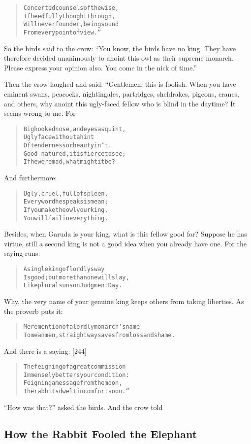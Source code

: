\documentclass[article, twoside, 14pt]{memoir}
\renewenvironment{verbatim}{%
\begin{quote}%
\vskip -10pt%
\begin{alltt}\normalfont\large}{\end{alltt}%
\end{quote}%
\vskip -10pt
} %
\begin{document}
\begin{verbatim}
Concerted counsels of the wise,
    If heedfully thought through,
Will never founder, being sound
    From every point of view.”
\end{verbatim}
So the birds said to the crow:
``You know, the birds have no king. They have therefore decided unanimously to anoint this owl as their supreme monarch. Please express your opinion also. You come in the nick of time.''

Then the crow laughed and said: “Gentlemen, this is foolish. When
you have eminent swans, peacocks, nightingales, partridges,
sheldrakes, pigeons, cranes, and others, why anoint this ugly-faced
fellow who is blind in the daytime? It seems wrong to me. For

\begin{verbatim}
Big hooked nose, and eyes asquint,
Ugly face without a hint
Of tenderness or beauty in 't.
Good-natured, it is fierce to see;
If he were mad, what might it be?
\end{verbatim}
And furthermore:

\begin{verbatim}
Ugly, cruel, full of spleen,
Every word he speaks is mean;
If you make the owl your king,
You will fail in everything.
\end{verbatim}
Besides, when Garuda is your king, what is this fellow good for?
Suppose he has virtue, still a second king is not a good idea when
you already have one. For the saying runs:

\begin{verbatim}
A single king of lordly sway
Is good; but more than one will slay,
Like plural suns on Judgment Day.
\end{verbatim}
Why, the very name of your genuine king keeps others from taking
liberties. As the proverb puts it:

\begin{verbatim}
Mere mention of a lordly monarch's name
To mean men, straightway saves from loss and shame.
\end{verbatim}
And there is a saying: [244]

\begin{verbatim}
The feigning of a great commission
Immensely betters your condition:
Feigning a message from the moon,
The rabbits dwelt in comfort soon.”
\end{verbatim}
``How was that?'' asked the birds. And the crow told

\subsection{How the Rabbit Fooled the Elephant}
\end{document}
